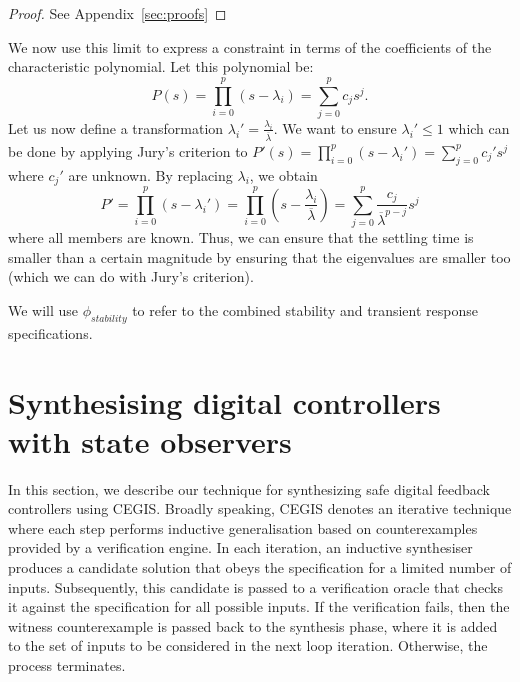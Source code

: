 \documentclass[sigconf]{llncs}
\begin{document}
\begin{proof}
See Appendix~\ref{sec:proofs}
\end{proof}
%
We now use this limit to express a constraint in terms of the
coefficients of the characteristic polynomial.  Let this
polynomial be:
%
\begin{equation}
P(s)=\prod_{i=0}^p (s-\lambda_i)=\sum_{j=0}^p c_js^j.
\end{equation}
%
Let us now define a
transformation $\lambda_i'=\frac{\lambda_i}{\overline{\lambda}}$.  We want
to ensure $\lambda_i' \leq 1$ which can be done by applying Jury's criterion
to $P'(s)=\prod_{i=0}^p (s-\lambda_i')=\sum_{j=0}^p c_j's^j$ where $c_j'$ are
unknown.  By replacing $\lambda_i$, we obtain
%
\begin{equation}
P'=\prod_{i=0}^p (s-\lambda_i')=\prod_{i=0}^p \left(s-\frac{\lambda_i}{\overline{\lambda}}\right)=\sum_{j=0}^p \frac{c_j}{\overline{\lambda}^{p-j}}s^j
\end{equation}
%
where all members are known. Thus, we can ensure that the settling time is smaller than
a certain magnitude by ensuring that 
the eigenvalues are smaller too (which we can do with Jury's criterion).

We will use $\phi_{stability}$ to refer to the combined stability and transient response specifications.

\section{Synthesising digital controllers with state observers}\label{sec:dynamic_synth}


In this section, we describe our technique for synthesizing safe
digital feedback controllers using CEGIS. Broadly speaking, CEGIS
denotes an iterative technique where each step performs inductive
generalisation based on counterexamples provided by a verification
engine. In each iteration, an inductive synthesiser produces a
candidate solution that obeys the specification for a limited number
of inputs. Subsequently, this candidate is passed to a verification
oracle that checks it against the specification for all possible
inputs. If the verification fails, then the witness counterexample is
passed back to the synthesis phase, where it is added to the set of
inputs to be considered in the next loop iteration. Otherwise, the process terminates.
\end{document}
